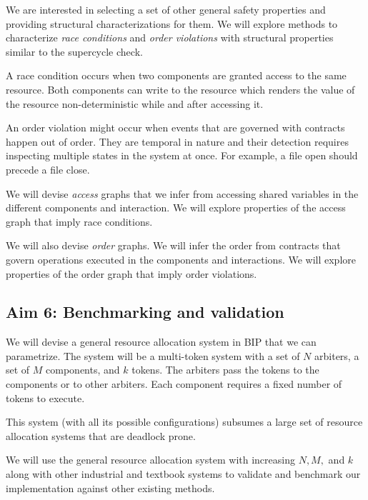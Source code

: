 We are interested in selecting a set of other general safety
properties and providing structural characterizations 
for them.
We will explore methods to characterize {\em race conditions}
and {\em order violations} with structural properties
similar to the supercycle check.

A race condition occurs when two components are granted access
to the same resource. Both components can write to the resource
which renders the value of the resource non-deterministic while
and after accessing it. 

An order violation might occur when events that are governed 
with contracts happen out of order.
They are temporal in nature and their detection requires
inspecting multiple states in the system at once. 
For example, a file open should precede a file close. 

We will devise {\em access} graphs that we infer from 
accessing shared variables in the different components 
and interaction.
We will explore properties of the access graph that 
imply race conditions. 

We will also devise {\em order} graphs. 
We will infer the order from contracts that 
govern operations executed in the components
and interactions. 
We will explore properties of the order graph that 
imply order violations.  

\subsection{Aim 6: Benchmarking and validation } 
 
 We will devise a general resource allocation system
 in BIP  that we can parametrize.
 The system will be a multi-token system 
 with a set of $N$ arbiters, a set of $M$ components,
 and $k$ tokens. 
 The arbiters pass the tokens to the components or to other
 arbiters. 
 Each component requires a fixed number of tokens to 
 execute. 

 This system (with all its possible configurations)
 subsumes a large set of resource allocation
 systems that are deadlock prone. 

 We will use the general resource allocation system 
 with increasing $N, M,$ and $k$ 
 along with other industrial and textbook systems
 to validate and benchmark our implementation
 against other existing methods. 

